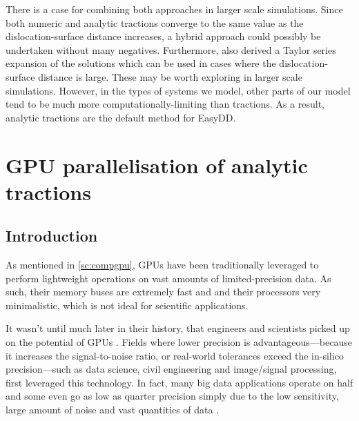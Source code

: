 
There is a case for combining both approaches in larger scale simulations. Since both numeric and analytic tractions converge to the same value as the dislocation-surface distance increases, a hybrid approach could possibly be undertaken without many negatives. Furthermore, \cite{analytic_tractions} also derived a Taylor series expansion of the solutions which can be used in cases where the dislocation-surface distance is large. These may be worth exploring in larger scale simulations. However, in the types of systems we model, other parts of our model tend to be much more computationally-limiting than tractions. As a result, analytic tractions are the default method for EasyDD.

\section{GPU parallelisation of analytic tractions}\label{s:parallel}

\subsection{Introduction}

As mentioned in \cref{sc:compgpu}, GPUs have been traditionally leveraged to perform lightweight operations on vast amounts of limited-precision data. As such, their memory buses are extremely fast and and their processors very minimalistic, which is not ideal for scientific applications.

It wasn't until much later in their history, that engineers and scientists picked up on the potential of GPUs \cite{gpu_comp,mixedPrecFEM,jia2014gpu}. Fields where lower precision is advantageous---because it increases the signal-to-noise ratio, or real-world tolerances exceed the in-silico precision---such as data science, civil engineering and image/signal processing, first leveraged this technology. In fact, many big data applications operate on half and some even go as low as quarter precision simply due to the low sensitivity, large amount of noise and vast quantities of data \cite{pagerank}.

